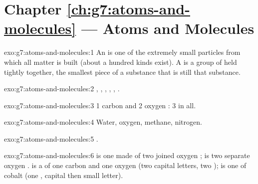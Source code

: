 \section*{Chapter \ref{ch:g7:atoms-and-molecules} --- Atoms and Molecules}

\begin{solution}{exo:g7:atoms-and-molecules:1}
An  is one of the extremely small particles from which all matter
is built (about a hundred kinds exist). A  is a group of 
held tightly together, the smallest piece of a substance that is still
that substance.
\end{solution}

\begin{solution}{exo:g7:atoms-and-molecules:2}
, , , , , .
\end{solution}

\begin{solution}{exo:g7:atoms-and-molecules:3}
1 carbon  and 2 oxygen : 3  in all.
\end{solution}

\begin{solution}{exo:g7:atoms-and-molecules:4}
Water, oxygen, methane, nitrogen.
\end{solution}

\begin{solution}{exo:g7:atoms-and-molecules:5}
.
\end{solution}

\begin{solution}{exo:g7:atoms-and-molecules:6}
 is one  made of two joined oxygen ;  is two
separate oxygen .  is a  of one carbon and one
oxygen  (two capital letters, two );  is one  of
cobalt (one , capital then small letter).
\end{solution}

